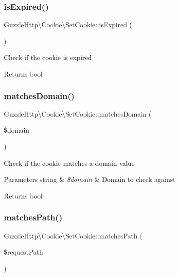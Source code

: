 \subsubsection{\texorpdfstring{is\+Expired()}{isExpired()}}
{\footnotesize\ttfamily Guzzle\+Http\textbackslash{}\+Cookie\textbackslash{}\+Set\+Cookie\+::is\+Expired (\begin{DoxyParamCaption}{ }\end{DoxyParamCaption})}

Check if the cookie is expired

\begin{DoxyReturn}{Returns}
bool 
\end{DoxyReturn}
\mbox{\label{classGuzzleHttp_1_1Cookie_1_1SetCookie_acecd9c6bca820c4e89714cd35e82e64f}} 
\subsubsection{\texorpdfstring{matches\+Domain()}{matchesDomain()}}
{\footnotesize\ttfamily Guzzle\+Http\textbackslash{}\+Cookie\textbackslash{}\+Set\+Cookie\+::matches\+Domain (\begin{DoxyParamCaption}\item[{}]{\$domain }\end{DoxyParamCaption})}

Check if the cookie matches a domain value


\begin{DoxyParams}[1]{Parameters}
string & {\em \$domain} & Domain to check against\\
\hline
\end{DoxyParams}
\begin{DoxyReturn}{Returns}
bool 
\end{DoxyReturn}
\mbox{\label{classGuzzleHttp_1_1Cookie_1_1SetCookie_af9b53dc34cbf781d766782dce05b86c0}} 
\subsubsection{\texorpdfstring{matches\+Path()}{matchesPath()}}
{\footnotesize\ttfamily Guzzle\+Http\textbackslash{}\+Cookie\textbackslash{}\+Set\+Cookie\+::matches\+Path (\begin{DoxyParamCaption}\item[{}]{\$request\+Path }\end{DoxyParamCaption})}

